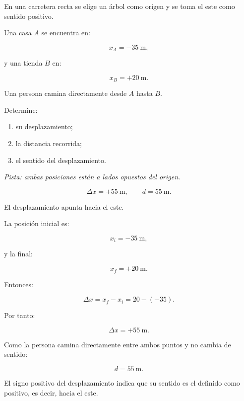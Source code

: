 \begin{ejercicio}
En una carretera recta se elige un árbol como origen y se toma el este como sentido positivo.

Una casa \(A\) se encuentra en:

\[ x_A=-\SI{35}{\meter}, \]

y una tienda \(B\) en:

\[ x_B=+\SI{20}{\meter}. \]

Una persona camina directamente desde \(A\) hasta \(B\).

Determine:

\begin{enumerate}[label=\alph*)]
    \item su desplazamiento;
    \item la distancia recorrida;
    \item el sentido del desplazamiento.
\end{enumerate}

\textit{Pista: ambas posiciones están a lados opuestos del origen.}
\end{ejercicio}

\begin{respuesta}
\[
\Delta x=+\SI{55}{\meter},
\qquad
d=\SI{55}{\meter}.
\]

El desplazamiento apunta hacia el este.
\end{respuesta}

\begin{explicacion}
La posición inicial es:

\[ x_i=-\SI{35}{\meter}, \]

y la final:

\[ x_f=+\SI{20}{\meter}. \]

Entonces:

\[
\Delta x
=
x_f-x_i
=
20-(-35).
\]

Por tanto:

\[ \boxed{\Delta x=+\SI{55}{\meter}}. \]

Como la persona camina directamente entre ambos puntos y no cambia de sentido:

\[ \boxed{d=\SI{55}{\meter}}. \]

El signo positivo del desplazamiento indica que su sentido es el definido como positivo, es decir, hacia el este.
\end{explicacion}


